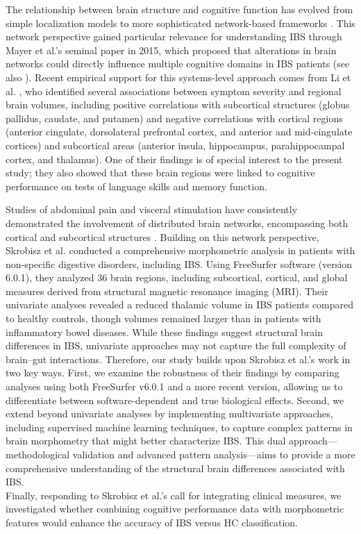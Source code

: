 \documentclass[diagnostics,article,accept,pdftex,moreauthors]{Definitions/mdpi}
\begin{document}
The relationship between brain structure and cognitive function has evolved from simple localization models to more sophisticated network-based frameworks \cite{lezak2004neuropsychological,park2013structural}. This network perspective gained particular relevance for understanding IBS through Mayer et al.'s \cite{mayer2015towards} seminal paper in 2015, which proposed that alterations in brain networks could directly influence multiple cognitive domains in IBS patients (see also \cite{mayer2019role}). Recent empirical support for this systems-level approach comes from Li et al. \cite{li2024irritable}, who identified several associations between symptom severity and regional brain volumes, including positive correlations with subcortical structures (globus pallidus, caudate, and putamen) and negative correlations with cortical regions (anterior cingulate, dorsolateral prefrontal cortex, and anterior and mid-cingulate cortices) and subcortical areas (anterior insula, hippocampus, parahippocampal cortex, and thalamus). One of their findings is of special interest to the present study; they also showed that these brain regions were linked to cognitive performance on tests of language skills and memory function. 


Studies of abdominal pain and visceral stimulation have consistently demonstrated the involvement of distributed brain networks, encompassing both cortical and subcortical structures \cite{labus2023sex, nan2020changes}. Building on this network perspective, Skrobisz et al. \cite{Skrobisz2022} conducted a comprehensive morphometric analysis in patients with non-specific digestive disorders, including IBS. Using FreeSurfer software (version 6.0.1), they analyzed 36 brain regions, including subcortical, cortical, and global measures derived from structural magnetic resonance imaging (MRI). Their univariate analyses revealed a reduced thalamic volume in IBS patients compared to healthy controls, though volumes remained larger than in patients with inflammatory bowel diseases. While these findings suggest structural brain differences in IBS, univariate approaches may not capture the full complexity of brain--gut interactions. Therefore, our study builds upon Skrobisz et al.'s work in two key ways. First, we examine the robustness of their findings by comparing analyses using both FreeSurfer v6.0.1 and a more recent version, allowing us to differentiate between software-dependent and true biological effects. Second, we extend beyond univariate analyses by implementing multivariate approaches, including supervised machine learning techniques, to capture complex patterns in brain morphometry that might better characterize IBS. This dual approach---methodological validation and advanced pattern analysis---aims to provide a more comprehensive understanding of the structural brain differences associated with IBS. \\
Finally, responding to Skrobisz et al.'s \cite{Skrobisz2022} call for integrating clinical measures, we investigated whether combining cognitive performance data with morphometric features would enhance the accuracy of IBS versus HC classification. 
\end{document}
